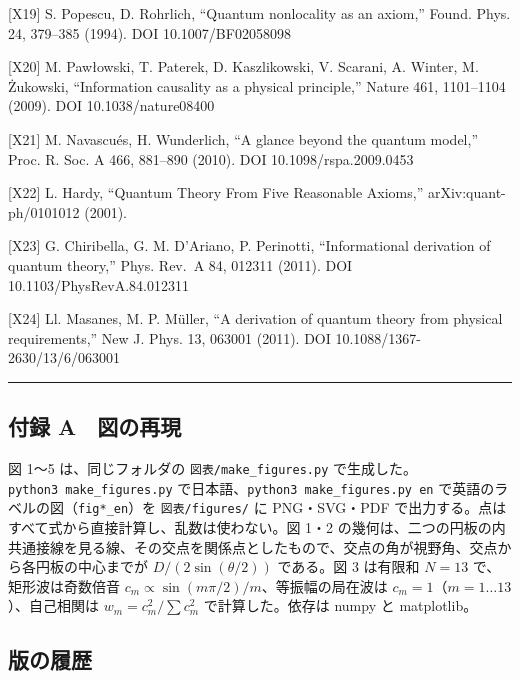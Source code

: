 \documentclass[
  a4paper,
]{ltjsarticle}
\begin{document}
{[}X19{]} S. Popescu, D. Rohrlich, ``Quantum nonlocality as an axiom,''
Found. Phys. 24, 379--385 (1994). DOI 10.1007/BF02058098

{[}X20{]} M. Pawłowski, T. Paterek, D. Kaszlikowski, V. Scarani, A.
Winter, M. Żukowski, ``Information causality as a physical principle,''
Nature 461, 1101--1104 (2009). DOI 10.1038/nature08400

{[}X21{]} M. Navascués, H. Wunderlich, ``A glance beyond the quantum
model,'' Proc. R. Soc. A 466, 881--890 (2010). DOI
10.1098/rspa.2009.0453

{[}X22{]} L. Hardy, ``Quantum Theory From Five Reasonable Axioms,''
arXiv:quant-ph/0101012 (2001).

{[}X23{]} G. Chiribella, G. M. D'Ariano, P. Perinotti, ``Informational
derivation of quantum theory,'' Phys. Rev.~A 84, 012311 (2011). DOI
10.1103/PhysRevA.84.012311

{[}X24{]} Ll. Masanes, M. P. Müller, ``A derivation of quantum theory
from physical requirements,'' New J. Phys. 13, 063001 (2011). DOI
10.1088/1367-2630/13/6/063001

\begin{center}\rule{0.5\linewidth}{0.5pt}\end{center}

\subsection{付録
A　図の再現}\label{ux4ed8ux9332-a-ux56f3ux306eux518dux73fe}

図 1〜5 は、同じフォルダの \texttt{図表/\allowbreak{}make\_\allowbreak{}figures.py}
で生成した。\texttt{python3\ make\_\allowbreak{}figures.py}
で日本語、\texttt{python3\ make\_\allowbreak{}figures.py\ en}
で英語のラベルの図（\texttt{fig*\_\allowbreak{}en}）を \texttt{図表/\allowbreak{}figures/\allowbreak{}} に
PNG・SVG・PDF で出力する。点はすべて式から直接計算し、乱数は使わない。図
1・2
の幾何は、二つの円板の内共通接線を見る線、その交点を関係点としたもので、交点の角が視野角、交点から各円板の中心までが
\(D/(2\sin(\theta/2))\) である。図 3 は有限和 \(N=13\)
で、矩形波は奇数倍音 \(c_m\propto\sin(m\pi/2)/m\)、等振幅の局在波は
\(c_m=1\)（\(m=1\ldots13\)）、自己相関は \(w_m=c_m^2/\sum c_m^2\)
で計算した。依存は numpy と matplotlib。

\subsection{版の履歴}\label{ux7248ux306eux5c65ux6b74}
\end{document}
